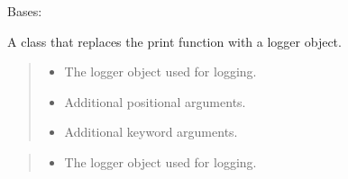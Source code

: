 \documentclass[a4paper,11pt,english,openany]{sphinxmanual}
\begin{document}
\begin{fulllineitems}
\label{\detokenize{api/spyice.utils.spyice_logger:src.spyice.utils.spyice_logger.SpyiceLogger}}
\pysigstartsignatures
\pysigline
{}
\pysigstopsignatures
\sphinxAtStartPar
Bases: 

\sphinxAtStartPar
A class that replaces the print function with a logger object.
\begin{quote}\begin{description}
\begin{itemize}
\item {} 
\sphinxAtStartPar
{} \textendash{} The logger object used for logging.

\item {} 
\sphinxAtStartPar
{} \textendash{} Additional positional arguments.

\item {} 
\sphinxAtStartPar
{} \textendash{} Additional keyword arguments.

\end{itemize}

\end{description}\end{quote}

\begin{fulllineitems}
\label{\detokenize{api/spyice.utils.spyice_logger:src.spyice.utils.spyice_logger.SpyiceLogger.__init__}}
\pysigstartsignatures
\pysiglinewithargsret
{}
{\sphinxparamcomma {}\sphinxparamcomma {}}
{}
\pysigstopsignatures\begin{quote}\begin{description}
\begin{itemize}
\item {} 
\sphinxAtStartPar
{} \textendash{} The logger object used for logging.


\end{itemize}
\end{description}
\end{quote}
\end{fulllineitems}
\end{fulllineitems}
\end{document}
